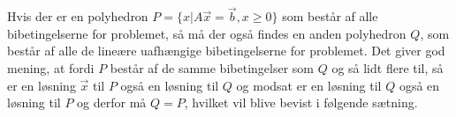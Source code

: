 Hvis der er en polyhedron $P=\{x|A\vec{x}=\vec{b},x\geq 0\}$ som består af alle bibetingelserne for problemet, så må der også findes en anden polyhedron $Q$, som består af alle de lineære uafhængige bibetingelserne for problemet. Det giver god mening, at fordi $P$ består af de samme bibetingelser som $Q$ og så lidt flere til, så er en løsning $\vec{x}$ til $P$ også en løsning til $Q$ og modsat er en løsning til $Q$ også en løsning til $P$ og derfor må $Q=P$, hvilket vil blive bevist i følgende sætning.
 
